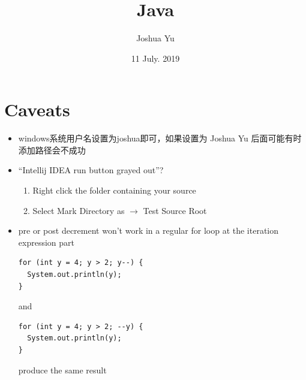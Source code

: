 \documentclass[a4paper, 12pt]{article}
\begin{document}

\large
\title{Java}
\author{Joshua Yu}
\date{11 July. 2019}
\maketitle
\tableofcontents


\section{Caveats}
\begin{itemize}
\item windows系统用户名设置为joshua即可，如果设置为 Joshua Yu 后面可能有时添加路径会不成功

\item ``Intellij IDEA run button grayed out''?
\begin{enumerate}
\item Right click the folder containing your source
\item Select Mark Directory as $\rightarrow$ Test Source Root
\end{enumerate}

\item pre or post decrement won't work in a regular for loop at the iteration expression part
\begin{verbatim}
for (int y = 4; y > 2; y--) {
  System.out.println(y);
}
\end{verbatim}
and
\begin{verbatim}
for (int y = 4; y > 2; --y) {
  System.out.println(y);
}
\end{verbatim}
produce the same result

\end{itemize}
\end{document}
